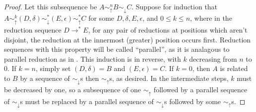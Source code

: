 \begin{proof}
  Let this subsequence be $A \sim_\uparrow^n B \sim_\downarrow C$. Suppose for induction that $A \sim_\uparrow^k (D,\delta) \sim_\downarrow^* (E,\epsilon) \sim_\uparrow^* C$ for some $D, \delta, E, \epsilon$, and $0 \leq k \leq n$, where in the reduction sequence $D \to^* E$, for any pair of reductions at positions which aren't disjoint, the reduction at the innermost (greater) position occurs first. Reduction sequences with this property will be called ``parallel'', as it is analagous to parallel reduction as in . This induction is in reverse, with $k$ decreasing from $n$ to $0$. If $k = n$, simply set $(D,\delta) = B$ and $(E,\epsilon) = C$. If $k = 0$, then $A$ is related to $B$ by a sequence of $\sim_\downarrow$s then $\sim_\uparrow$s, as desired. In the intermediate steps, $k$ must be decreased by one, so a subsequence of one $\sim_\uparrow$ followed by a parallel sequence of $\sim_\downarrow$s must be replaced by a parallel sequence of $\sim_\downarrow$s followed by some $\sim_\uparrow$s.


\end{proof}
